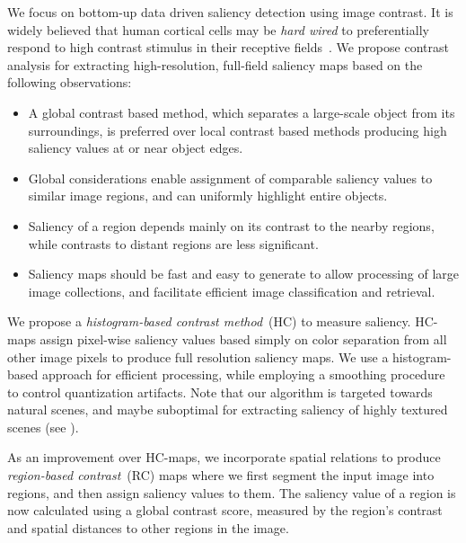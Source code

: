 \documentclass[final]{cvpr}
\newcommand{\HC}{HC-maps }
\begin{document}
We focus on bottom-up data driven saliency detection using image contrast.
%
It is widely believed that human cortical cells may be \emph{hard wired} to preferentially respond
to high contrast stimulus in their receptive fields~\cite{03neuron/Reynolds_attentionSaliency}.
%
We propose contrast analysis for extracting high-resolution, full-field saliency maps based on the
following observations:
\begin{itemize}
  \item A global contrast based method, which separates a large-scale object from its surroundings,
    is preferred over local contrast based methods producing high saliency values at or near object edges.
  \item Global considerations enable assignment of comparable saliency values to similar image regions,
    and can uniformly highlight entire objects.
  \item Saliency of a region depends mainly on its contrast to the nearby regions,
    while contrasts to distant regions are less significant.
  \item Saliency maps should be fast and easy to generate to allow processing of
    large image collections, and facilitate efficient image classification and retrieval.
\end{itemize}


We propose a \emph{histogram-based contrast method}~(HC) to measure saliency.
%
\HC assign pixel-wise saliency values based simply on color separation from all other image
pixels to produce full resolution saliency maps. We use a histogram-based approach for efficient processing,
while employing a smoothing procedure to control quantization artifacts.
%
Note that our algorithm is targeted towards natural scenes,
and maybe suboptimal for extracting saliency of highly textured scenes (see ).


As an improvement over HC-maps, we incorporate spatial relations to produce
\emph{region-based contrast}~(RC) maps where we first segment the input image into
regions, and then assign saliency values to them. The saliency value of a region is
now calculated using a global contrast score, measured by the region's
contrast and spatial distances to other regions in the image.
\end{document}
